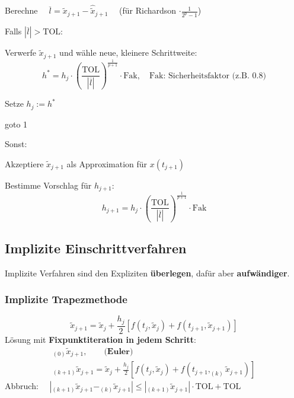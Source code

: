 				\begin{algo}
					\begin{tightenumerate}
						\item Berechne $\quad\overline{l}= \tilde x_{j+1} - \hat{\tilde{x}}_{j+1} \quad$ (für Richardson $\cdot \frac{1}{2^p-1}$)
						\item Falls $|\overline{l}| > \mathrm{TOL}$:
						\begin{tightitemize}
							\item Verwerfe $\tilde{x}_{j+1}$ und wähle neue, kleinere Schrittweite:
								\[
									h^* = h_j \cdot \left( \frac{\mathrm{TOL}}{|\overline{l}|}\right)^{\frac{1}{p+1}}\cdot \mathrm{Fak}, \quad \text{Fak: Sicherheitsfaktor (z.B.~$0.8$)}
								\]
							\item Setze $h_j := h^*$ 
							\item goto 1 
						\end{tightitemize}
						\item Sonst: 
						\begin{tightitemize}
							\item Akzeptiere $\tilde x_{j+1}$ als Approximation für $x(t_{j+1})$
							\item Bestimme Vorschlag für $h_{j+1}$:
								\[
									h_{j+1} = h_j \cdot \left( \frac{\mathrm{TOL}}{|\overline{l}|}\right)^{\frac{1}{p+1}}\cdot \mathrm{Fak}
								\]
						\end{tightitemize}
					\end{tightenumerate}
				\end{algo}
				
	\subsection{Implizite Einschrittverfahren}
		Implizite Verfahren sind den Expliziten \textbf{überlegen}, dafür aber \textbf{aufwändiger}. 
		
		\subsubsection{Implizite Trapezmethode}
			\[
				\tilde x_{j+1}=\tilde x_j + \frac{h_j}{2}\left[ f(t_j, \tilde x_j)+f(t_{j+1},\tilde x_{j+1})\right]
			\]
			Lösung mit \textbf{Fixpunktiteration in jedem Schritt}:
			\begin{gather*}
				_{(0)} \tilde x_{j+1}, \qquad \textbf{(Euler)} \\
				_{(k+1)}\tilde x_{j+1} = \tilde x_j + \frac{h_j}{2}\left[ f(t_j,\tilde x_j) + f(t_{j+1}, _{(k)} \tilde x_{j+1})\right]
			\end{gather*}
			Abbruch: $\quad |_{(k+1)}\tilde x_{j+1} - _{(k)} \tilde x_{j+1}| \leq |_{(k+1)}\tilde x_{j+1}|\cdot \mathrm{TOL}+\mathrm{TOL}$
			
